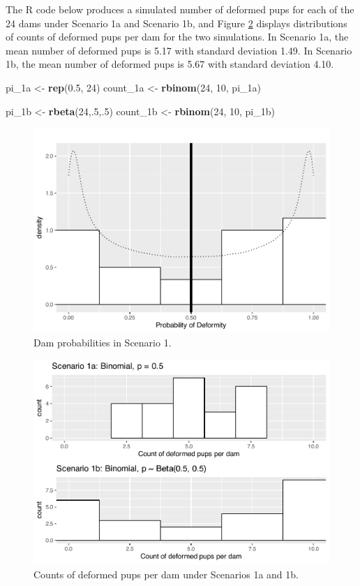 \documentclass[
]{krantz}
\newenvironment{Shaded}{\begin{snugshade}}{\end{snugshade}}
\newcommand{\DecValTok}[1]{\textcolor[rgb]{0.06,0.06,0.06}{#1}}
\newcommand{\FloatTok}[1]{\textcolor[rgb]{0.06,0.06,0.06}{#1}}
\newcommand{\KeywordTok}[1]{\textcolor[rgb]{0.27,0.27,0.27}{\textbf{#1}}}
\newcommand{\NormalTok}[1]{#1}
\newcommand{\StringTok}[1]{\textcolor[rgb]{0.5,0.5,0.5}{#1}}
\begin{document}
The R code below produces a simulated number of deformed pups for each of the 24 dams under Scenario 1a and Scenario 1b, and Figure \ref{fig:scenario1Plot} displays distributions of counts of deformed pups per dam for the two simulations. In Scenario 1a, the mean number of deformed pups is 5.17 with standard deviation 1.49. In Scenario 1b, the mean number of deformed pups is 5.67 with standard deviation 4.10.

\begin{Shaded}
\begin{Highlighting}[]
\NormalTok{pi_1a <-}\StringTok{ }\KeywordTok{rep}\NormalTok{(}\FloatTok{0.5}\NormalTok{, }\DecValTok{24}\NormalTok{)}
\NormalTok{count_1a <-}\StringTok{ }\KeywordTok{rbinom}\NormalTok{(}\DecValTok{24}\NormalTok{, }\DecValTok{10}\NormalTok{, pi_1a)}

\NormalTok{pi_1b <-}\StringTok{ }\KeywordTok{rbeta}\NormalTok{(}\DecValTok{24}\NormalTok{,.}\DecValTok{5}\NormalTok{,.}\DecValTok{5}\NormalTok{)  }
\NormalTok{count_1b <-}\StringTok{ }\KeywordTok{rbinom}\NormalTok{(}\DecValTok{24}\NormalTok{, }\DecValTok{10}\NormalTok{, pi_1b)  }
\end{Highlighting}
\end{Shaded}

\begin{figure}

{\centering \includegraphics[width=0.6\linewidth]{bookdown-BeyondMLR_files/figure-latex/scenario1ProbabilityPlot-1} 

}

\caption{Dam probabilities in Scenario 1.}\label{fig:scenario1ProbabilityPlot}
\end{figure}

\begin{figure}

{\centering \includegraphics[width=0.6\linewidth]{bookdown-BeyondMLR_files/figure-latex/scenario1Plot-1} 

}

\caption{Counts of deformed pups per dam under Scenarios 1a and 1b.}\label{fig:scenario1Plot}
\end{figure}
\end{document}
